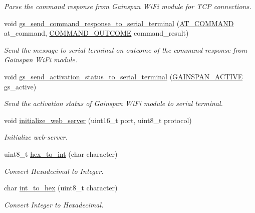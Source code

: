 \begin{DoxyCompactItemize}
\begin{DoxyCompactList}\small\item\em Parse the command response from Gainspan Wi\+Fi module for T\+CP connections. \end{DoxyCompactList}\item 
void \hyperlink{group__wireless__interface_gab14afdb0319dfc1020c5b71a7261c094}{gs\+\_\+send\+\_\+command\+\_\+response\+\_\+to\+\_\+serial\+\_\+terminal} (\hyperlink{group__wireless__interface_ga4086b0cc4b349f6204256017ac437d3f}{A\+T\+\_\+\+C\+O\+M\+M\+A\+ND} at\+\_\+command, \hyperlink{group__wireless__interface_gab9cb187a993cee0dab2a6e72223e00d1}{C\+O\+M\+M\+A\+N\+D\+\_\+\+O\+U\+T\+C\+O\+ME} command\+\_\+result)
\begin{DoxyCompactList}\small\item\em Send the message to serial terminal on outcome of the command response from Gainspan Wi\+Fi module. \end{DoxyCompactList}\item 
void \hyperlink{group__wireless__interface_gac1bd431c75381b77fadd0df01280ed57}{gs\+\_\+send\+\_\+activation\+\_\+status\+\_\+to\+\_\+serial\+\_\+terminal} (\hyperlink{group__wireless__interface_ga2d6a1c69aec7812a8dc23ed99f96558e}{G\+A\+I\+N\+S\+P\+A\+N\+\_\+\+A\+C\+T\+I\+VE} gs\+\_\+active)
\begin{DoxyCompactList}\small\item\em Send the activation status of Gainspan Wi\+Fi module to serial terminal. \end{DoxyCompactList}\item 
void \hyperlink{group__wireless__interface_gac6496e86569ad26b1df8045b14eb0b71}{initialize\+\_\+web\+\_\+server} (uint16\+\_\+t port, uint8\+\_\+t protocol)
\begin{DoxyCompactList}\small\item\em Initialize web-\/server. \end{DoxyCompactList}\item 
uint8\+\_\+t \hyperlink{group__wireless__interface_ga3bee5fd668cac8e57bf74dd50460053e}{hex\+\_\+to\+\_\+int} (char character)
\begin{DoxyCompactList}\small\item\em Convert Hexadecimal to Integer. \end{DoxyCompactList}\item 
char \hyperlink{group__wireless__interface_gac6ffcd32b33eedd6fc20775b3c18b044}{int\+\_\+to\+\_\+hex} (uint8\+\_\+t character)
\begin{DoxyCompactList}\small\item\em Convert Integer to Hexadecimal. \end{DoxyCompactList}\item 

\end{DoxyCompactItemize}
